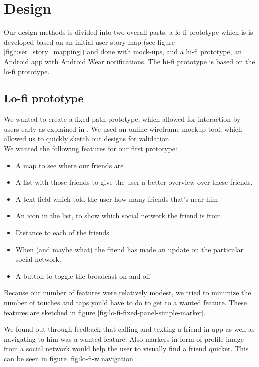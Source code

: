 \documentclass[runningheads,a4paper]{llncs}
\begin{document}
\section{Design}\label{design}
Our design methods is divided into two overall parts: a lo-fi prototype which is is developed based on an initial user story map (see figure \ref{fig:user_story_mapping}) and done with mock-ups, and a hi-fi prototype, an Android app with Android Wear notifications. The hi-fi prototype is based on the lo-fi prototype. 

\subsection{Lo-fi prototype}
We wanted to create a fixed-path prototype, which allowed for interaction by users early as explained in \cite{prototyping}. We used an online wireframe mockup tool\cite{ninja}, which allowed us to quickly sketch out designs for validation. \\


We wanted the following features for our first prototype: 
\begin{itemize}
  \item A map to see where our friends are 
	\item A list with those friends to give the user a better overview over these friends. 
	\item A text-field which told the user how many friends that’s near him
	\item An icon in the list, to show which social network the friend is from
	\item Distance to each of the friends
	\item When (and maybe what) the friend has made an update on the particular social network.
	\item A button to toggle the broadcast on and off\\ 
\end{itemize}

Because our number of features were relatively modest, we tried to minimize the number of touches and taps you'd have to do to get to a wanted feature. These features are sketched in figure \ref{fig:lo-fi-fixed-panel-simple-marker}.

We found out through feedback that calling and texting a friend in-app as well as navigating to him was a wanted feature. Also markers in form of profile image from a social network would help the user to visually find a friend quicker. This can be seen in figure \ref{fig:lo-fi-w.navigation}. 
\end{document}
